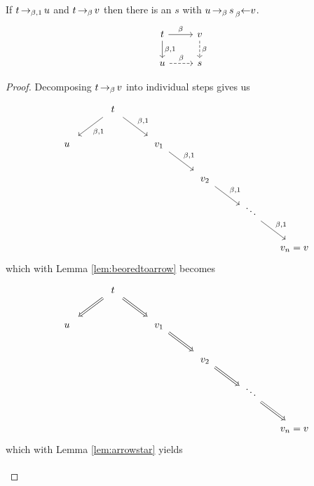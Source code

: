\begin{boxlem}\label{lem:almostconfluence}
    If $t \operatorname{\to_{\beta, 1}} u$ and $t \operatorname{\to_{\beta}} v$ then there is an $s$ with $u \operatorname{\to_{\beta}} s \prescript{}{\beta}{\leftarrow} v$.
    \begin{equation*}
        \begin{tikzcd}[ampersand replacement=\&]
            t \ar[r, "\beta"] \ar[d, "{\beta, 1}"] \& v \ar[d, dashed, "\beta"] \\
            u \ar[r, dashed, "\beta"] \& s 
        \end{tikzcd}
    \end{equation*}
\end{boxlem}
\begin{proof}
    Decomposing $t \operatorname{\to_{\beta}} v$ into individual steps gives us
    \begin{equation*}
        \begin{tikzcd}[/tikz/cells={/tikz/nodes={shape=asymmetrical
            rectangle,text width=0.5cm,text height=2ex,text depth=0.3ex,align=center}}]
            & t \ar[dl, "{\beta, 1}"] \ar[dr, "{\beta, 1}"] & \\
            u && v_1 \ar[dr, "{\beta, 1}"] \\
            &&& v_2 \ar[dr, "{\beta, 1}"] \\
            &&&& \ddots \ar[dr, "{\beta, 1}"] \\
            &&&&& \mathllap{v_n} = \mathrlap{v}
        \end{tikzcd}
    \end{equation*}
    which with Lemma \ref{lem:beoredtoarrow} becomes
    \begin{equation*}
        \begin{tikzcd}[/tikz/cells={/tikz/nodes={shape=asymmetrical
            rectangle,text width=0.5cm,text height=2ex,text depth=0.3ex,align=center}}]
            & t \ar[dl, Rightarrow] \ar[dr, Rightarrow] & \\
            u && v_1 \ar[dr, Rightarrow] \\
            &&& v_2 \ar[dr, Rightarrow] \\
            &&&& \ddots \ar[dr, Rightarrow] \\
            &&&&& \mathllap{v_n} = \mathrlap{v}
        \end{tikzcd}
    \end{equation*}
    which with Lemma \ref{lem:arrowstar} yields
    \begin{equation*}
        \begin{tikzcd}[/tikz/cells={/tikz/nodes={shape=asymmetrical
            rectangle,text width=0.5cm,text height=2ex,text depth=0.3ex,align=center}}]

\end{tikzcd}
\end{equation*}
\end{proof}
